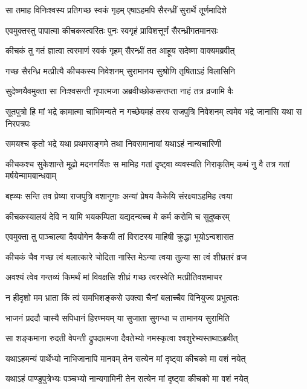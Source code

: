 \twolineshloka
{सा तमाह विनिःश्वस्य प्रतिगच्छ स्वकं गृहम्}
{एषाऽहमपि सैरन्ध्रीं सुरार्थे तूर्णमादिशे}


\twolineshloka
{एवमुक्तस्तु पापात्मा कीचकस्त्वरितः पुनः}
{स्वगृहं प्राविशत्तूर्णं सैरन्ध्रीगतमानसः}


\twolineshloka
{कीचकं तु गतं ज्ञात्वा त्वरमाणं स्वकं गृहम्}
{सैरन्ध्रीं तत आहूय सदेष्णा वाक्यमब्रवीत्}


\twolineshloka
{गच्छ सैरन्ध्रि मत्प्रीत्यै कीचकस्य निवेशनम्}
{सुरामानय सुश्रोणि तृषिताऽहं विलासिनि}



\twolineshloka
{सुदेष्णयैवमुक्ता सा निःश्वसन्ती नृपात्मजा}
{अब्रवीच्छोकसन्तप्ता नाहं तत्र व्रजामि वैः}


\threelineshloka
{सूतपुत्रो हि मां भद्रे कामात्मा चाभिमन्यते}
{न गच्छेयमहं तस्य राजपुत्रि निवेशनम्}
{त्वमेव भद्रे जानासि यथा स निरपत्रपः}


\twolineshloka
{समयश्च कृतो भद्रे यथा प्रथमसङ्गमे}
{तथा निवसमानायां यथाऽहं नान्यचारिणी}


\threelineshloka
{कीचकश्च सुकेशान्ते मूढो मदनगर्वितः}
{स मामिह गतां दृष्ट्वा व्यवस्यति निराकृतिम्}
{कथं नु वै तत्र गतां मर्षयेन्मामबान्धवाम्}


\twolineshloka
{बह्व्यः सन्ति तव प्रेष्या राजपुत्रि वशानुगाः}
{अन्यां प्रेषय कैकेयि संरक्ष्याऽहमिह त्वया}


\twolineshloka
{कीचकस्यालयं देवि न यामि भयकम्पिता}
{यद्यदन्यच्च मे कर्म करोमि च सुदुष्करम्}


\twolineshloka
{एवमुक्ता तु पाञ्चाल्या दैवयोगेन कैकयी}
{तां विराटस्य माहिषी क्रुद्धा भूयोऽन्वशासत}


\twolineshloka
{कीचकं चैव गच्छ त्वं बलात्कारे चोदिता}
{नास्ति मेऽन्या त्वया तुल्या सा त्वं शीघ्रतरं व्रज}


\twolineshloka
{अवश्यं त्वेव गन्तव्यं किमर्थं मां विवक्षसि}
{शीघ्रं गच्छ त्वरस्वेति मत्प्रीतिवशमाचर}


\twolineshloka
{न हीदृशो मम भ्राता किं त्वं समभिशङ्कसे}
{उक्त्वा चैनां बलाच्चैव विनियुज्य प्रभुत्वतः}


\twolineshloka
{भाजनं प्रददौ चास्यै सपिधानं हिरण्मयम्}
{या सुजाता सुगन्धा च तामानय सुरामिति}


\twolineshloka
{सा शङ्कमाना रुदती वेपन्ती द्रुपदात्मजा}
{दैवतेभ्यो नमस्कृत्वा श्वशुरेभ्यस्तथाऽब्रवीत्}


\twolineshloka
{यथाऽहमन्यं पार्थेभ्यो नाभिजानापि मानवम्}
{तेन सत्येन मां दृष्ट्वा कीचको मा वशं नयेत्}


\twolineshloka
{यथाऽहं पाण्डुपुत्रेभ्यः पञ्चभ्यो नान्यगामिनी}
{तेन सत्येन मां दृष्ट्वा कीचको मा वशं नयेत्}


